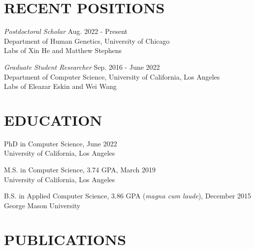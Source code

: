 \documentclass[margin, 10pt]{res} %
\begin{document}
\begin{resume}


\section{RECENT POSITIONS}

{\sl Postdoctoral Scholar} \hfill Aug. 2022 - Present \\ Department of Human Genetics, University of Chicago \\ Labs of Xin He and Matthew Stephens

{\sl Graduate Student Researcher} \hfill Sep. 2016 - June 2022 \\ Department of Computer Science, University of California, Los Angeles \\ Labs of Eleazar Eskin and Wei Wang



\section{EDUCATION}

PhD in Computer Science, June 2022 \\
University of California, Los Angeles

M.S. in Computer Science, 3.74 GPA, March 2019 \\
University of California, Los Angeles

B.S. in Applied Computer Science, 3.86 GPA ({\sl magna cum laude}), December 2015 \\
George Mason University
  

\section{PUBLICATIONS}

 



\end{resume}
\end{document}
